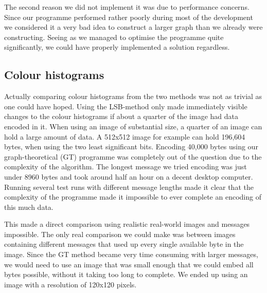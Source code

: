 The second reason we did not implement it was due to performance concerns.
Since our programme performed rather poorly during most of the development we considered it a very bad idea to construct a larger graph than we already were constructing.
Seeing as we managed to optimise the programme quite significantly, we could have properly implemented a solution regardless.

\subsection{Colour histograms}
Actually comparing colour histograms from the two methods was not as trivial as one could have hoped.
Using the LSB-method only made immediately visible changes to the colour histograms if about a quarter of the image had data encoded in it.
When using an image of substantial size, a quarter of an image can hold a large amount of data. 
A 512x512 image for example can hold 196,604 bytes, when using the two least significant bits.
Encoding 40,000 bytes using our graph-theoretical (GT) programme was completely out of the question due to the complexity of the algorithm.
The longest message we tried encoding was just under 8960 bytes and took around half an hour on a decent desktop computer.
Running several test runs with different message lengths made it clear that the complexity of the programme made it impossible to ever complete an encoding of this much data.

This made a direct comparison using realistic real-world images and messages impossible. 
The only real comparison we could make was between images containing different messages that used up every single available byte in the image.
Since the GT method became very time consuming with larger messages, we would need to use an image that was small enough that we could embed all bytes possible, without it taking too long to complete.
We ended up using an image with a resolution of 120x120 pixels.

